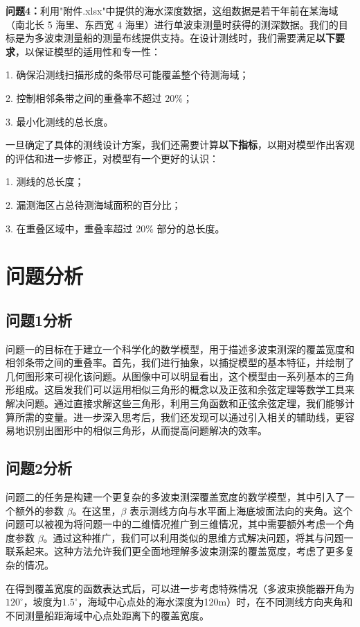 \documentclass{cumcmthesis}
\begin{document}
\textbf{问题4：}利用"附件.xlsx"中提供的海水深度数据，这组数据是若干年前在某海域（南北长 5 海里、东西宽 4 海里）进行单波束测量时获得的测深数据。我们的目标是为多波束测量船的测量布线提供支持。在设计测线时，我们需要满足\textbf{以下要求}，以保证模型的适用性和专一性：

 1. 确保沿测线扫描形成的条带尽可能覆盖整个待测海域；

 2. 控制相邻条带之间的重叠率不超过 $20\%$；

 3. 最小化测线的总长度。

一旦确定了具体的测线设计方案，我们还需要计算\textbf{以下指标}，以期对模型作出客观的评估和进一步修正，对模型有一个更好的认识：

 1. 测线的总长度；

 2. 漏测海区占总待测海域面积的百分比；

 3. 在重叠区域中，重叠率超过 $20\%$ 部分的总长度。

\section{问题分析}
\subsection{问题1分析}
问题一的目标在于建立一个科学化的数学模型，用于描述多波束测深的覆盖宽度和相邻条带之间的重叠率。首先，我们进行抽象，以捕捉模型的基本特征，并绘制了几何图形来可视化该问题。从图像中可以明显看出，这个模型由一系列基本的三角形组成。这启发我们可以运用相似三角形的概念以及正弦和余弦定理等数学工具来解决问题。通过直接求解这些三角形，利用三角函数和正弦余弦定理，我们能够计算所需的变量。进一步深入思考后，我们还发现可以通过引入相关的辅助线，更容易地识别出图形中的相似三角形，从而提高问题解决的效率。
\subsection{问题2分析}
问题二的任务是构建一个更复杂的多波束测深覆盖宽度的数学模型，其中引入了一个额外的参数 $\beta$。在这里，$\beta$ 表示测线方向与水平面上海底坡面法向的夹角。这个问题可以被视为将问题一中的二维情况推广到三维情况，其中需要额外考虑一个角度参数 $\beta$。通过这种推广，我们可以利用类似的思维方式解决问题，将其与问题一联系起来。这种方法允许我们更全面地理解多波束测深的覆盖宽度，考虑了更多复杂的情况。

在得到覆盖宽度的函数表达式后，可以进一步考虑特殊情况（多波束换能器开角为$120^\circ$，坡度为$1.5^\circ $，海域中心点处的海水深度为120m）时，在不同测线方向夹角和不同测量船距海域中心点处距离下的覆盖宽度。
\end{document}
